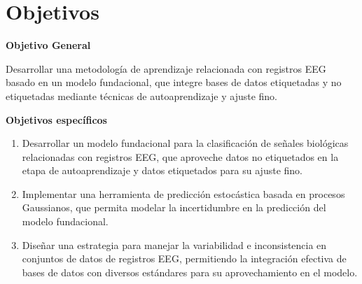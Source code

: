 \section{Objetivos}

\textbf{Objetivo General}

Desarrollar una metodología de aprendizaje relacionada con registros EEG basado en un modelo fundacional, que integre bases de datos etiquetadas y no etiquetadas mediante técnicas de autoaprendizaje y ajuste fino.

\textbf{Objetivos específicos }

\begin{enumerate}
	\item Desarrollar un modelo fundacional para la clasificación de señales biológicas relacionadas con registros EEG, que aproveche datos no etiquetados en la etapa de autoaprendizaje y datos etiquetados para su ajuste fino.
	
	\item Implementar una herramienta de predicción estocástica basada en procesos Gaussianos, que permita modelar la incertidumbre en la predicción del modelo fundacional.
	
	\item Diseñar una estrategia para manejar la variabilidad e inconsistencia en conjuntos de datos de registros EEG, permitiendo la integración efectiva de bases de datos con diversos estándares para su aprovechamiento en el modelo.
\end{enumerate}